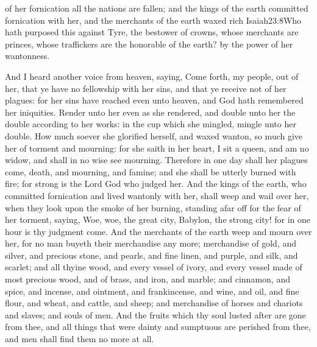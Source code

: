  of her fornication all the nations are fallen; and the kings of the earth committed fornication with her,%
 and the merchants of the earth waxed rich%
			{Isaiah}{23:8}{Who hath purposed this against Tyre, the bestower of crowns, whose merchants are princes, whose traffickers are the honorable of the earth?}
 by the power of her wantonness.

 And I heard another voice from heaven, saying, Come forth, my people, out of her, that ye have no fellowship with her sins, and that ye receive not of her plagues: 
 for her sins have reached even unto heaven, and God hath remembered her iniquities. 
 Render unto her even as she rendered, and double unto her the double according to her works: in the cup which she mingled, mingle unto her double. 
 How much soever she glorified herself, and waxed wanton, so much give her of torment and mourning: for she saith in her heart, I sit a queen, and am no widow, and shall in no wise see mourning. 
 Therefore in one day shall her plagues come, death, and mourning, and famine; and she shall be utterly burned with fire; for strong is the Lord God who judged her. 
 And the kings of the earth, who committed fornication and lived wantonly with her, shall weep and wail over her, when they look upon the smoke of her burning, 
 standing afar off for the fear of her torment, saying, Woe, woe, the great city, Babylon, the strong city! for in one hour is thy judgment come. 
 And the merchants of the earth weep and mourn over her, for no man buyeth their merchandise any more; 
 merchandise of gold, and silver, and precious stone, and pearls, and fine linen, and purple, and silk, and scarlet; and all thyine wood, and every vessel of ivory, and every vessel made of most precious wood, and of brass, and iron, and marble; 
 and cinnamon, and spice, and incense, and ointment, and frankincense, and wine, and oil, and fine flour, and wheat, and cattle, and sheep; and merchandise of horses and chariots and slaves; and souls of men. 
 And the fruits which thy soul lusted after are gone from thee, and all things that were dainty and sumptuous are perished from thee, and men shall find them no more at all. 
